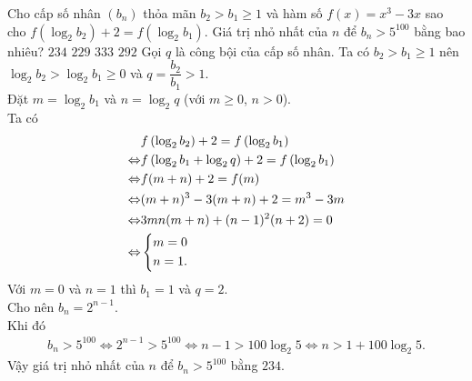 \begin{ex}%
 Cho cấp số nhân $(b_n)$ thỏa mãn $b_2 > b_1 \geq 1$ và hàm số $f(x) = x^3 - 3x$ sao cho $f \left( \log_2 b_2 \right) + 2 = f \left( \log_2 b_1 \right)$. Giá trị nhỏ nhất của $n$ để $b_n > 5^{100}$ bằng bao nhiêu?
 \choice
  {\True $234$}
  {$229$}
  {$333$}
  {$292$}
 \loigiai
  {
  Gọi $q$ là công bội của cấp số nhân.
  Ta có $b_2 > b_1 \geq 1$ nên $\log_2 b_2 > \log_2 b_1 \geq 0$ và $q = \dfrac{b_2}{b_1} > 1$.\\
  Đặt $m = \log_2 b_1$ và $n = \log_2 q$ (với $m \geq 0$, $n > 0$).\\
  Ta có
  \begin{align*}
   & f \left( \log_2 b_2 \right) + 2 = f \left( \log_2 b_1 \right) \\
   \Leftrightarrow & f \left( \log_2 b_1 + \log_2 q \right) + 2 = f \left( \log_2 b_1 \right) \\
   \Leftrightarrow & f(m + n) + 2 = f(m) \\
   \Leftrightarrow & (m + n)^3 - 3(m + n) + 2 = m^3 - 3m \\
   \Leftrightarrow & 3mn(m + n) + (n - 1)^2 (n + 2) = 0 \\
   \Leftrightarrow & \left\{\begin{aligned}& m = 0 \\& n = 1.\end{aligned}\right.
  \end{align*}
  Với $m = 0$ và $n = 1$ thì $b_1 = 1$ và $q = 2$.\\
  Cho nên $b_n = 2^{n - 1}$.\\
  Khi đó
  \begin{align*}
   b_n > 5^{100} \Leftrightarrow 2^{n - 1} > 5^{100} \Leftrightarrow n - 1 > 100 \log_2 5 \Leftrightarrow n > 1 + 100 \log_2 5.
  \end{align*}
  Vậy giá trị nhỏ nhất của $n$ để $b_n > 5^{100}$ bằng $234$.
  }
\end{ex}


